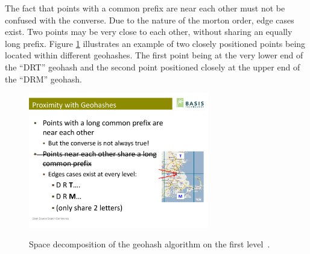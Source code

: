The fact that points with a common prefix are near each other must not be confused with the converse. Due to the nature of the morton order, edge cases exist. Two points may be very close to each other, without sharing an equally long prefix. Figure \ref{fig:geohash-edge} illustrates an example of two closely positioned points being located within different geohashes. The first point being at the very lower end of the ``DRT'' geohash and the second point positioned closely at the upper end of the ``DRM'' geohash. 

\begin{figure}[h]
  \begin{center}
    \includegraphics[width=0.7\textwidth]{figures/geohash_edges.pdf}
    \label{fig:geohash-edge}
    \caption{Space decomposition of the geohash algorithm on the first level~\cite{Smiley11geohash}.}
  \end{center}
\end{figure}



























